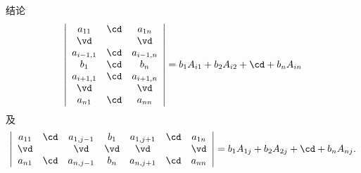 \begin{frame}
  \begin{footnotesize}
    \begin{block}{结论}
      $$
      \left|
      \begin{array}{ccc}
        a_{11} & \cd & a_{1n} \\
        \vd   &     & \vd \\
        a_{i-1,1} & \cd & a_{i-1,n} \\
        b_1   &  \cd   & b_n \\
        a_{i+1,1} & \cd & a_{i+1,n} \\
        \vd   &     & \vd \\
        a_{n1} & \cd & a_{nn}
      \end{array}
      \right|
      = b_1A_{i1} + b_2 A_{i2} + \cd + b_n A_{in} 
      $$
      及
      $$
      \left|
      \begin{array}{ccccccc}
        a_{11} & \cd & a_{1,j-1} & b_1 & a_{1,j+1} & \cd & a_{1n} \\
        \vd   &      & \vd      & \vd & \vd      &     & \vd \\
        a_{n1} & \cd & a_{n,j-1} & b_n & a_{n,j+1} & \cd & a_{nn} 
      \end{array}
      \right|
      = b_1A_{1j} + b_2 A_{2j} + \cd + b_n A_{nj}. 
      $$

    \end{block}
  \end{footnotesize}
\end{frame}


